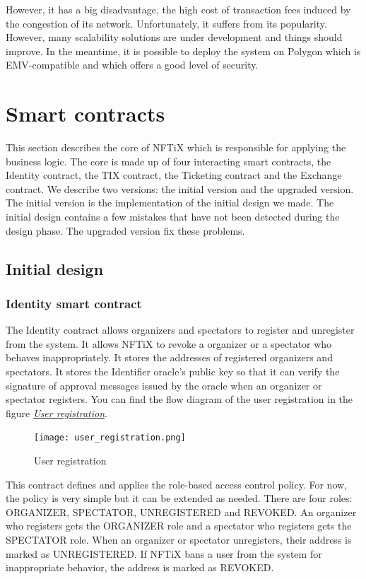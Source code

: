 \documentclass[a4paper,11pt,oneside]{report}
\begin{document}
However, it has a big disadvantage, the high cost of transaction fees induced by the congestion of its network. Unfortunately, it suffers from its popularity. However, many scalability solutions are under development and things should improve. In the meantime, it is possible to deploy the system on Polygon which is EMV-compatible and which offers a good level of security.

\section{Smart contracts}
This section describes the core of NFTiX which is responsible for applying the business logic. The core is made up of four interacting smart contracts, the Identity contract, the TIX contract, the Ticketing contract and the Exchange contract. We describe two versions: the initial version and the upgraded version. The initial version is the implementation of the initial design we made. The initial design contains a few mistakes that have not been detected during the design phase. The upgraded version fix these problems.

\subsection{Initial design}

\subsubsection{Identity smart contract}
The Identity contract allows organizers and spectators to register and unregister from the system. It allows NFTiX to revoke a organizer or a spectator who behaves inappropriately. It stores the addresses of registered organizers and spectators. It stores the Identifier oracle's public key so that it can verify the signature of approval messages issued by the oracle when an organizer or spectator registers. You can find the flow diagram of the user registration in the figure  \hyperref[fig:user_registration]{ \textit{User registration}}.

\begin{figure}[h!]
  \texttt{[image: user\_registration.png]}
  \caption{User registration}
  \label{fig:user_registration}
\end{figure}

This contract defines and applies the role-based access control policy. For now, the policy is very simple but it can be extended as needed. There are four roles: ORGANIZER, SPECTATOR, UNREGISTERED and REVOKED. An organizer who registers gets the ORGANIZER role and a spectator who registers gets the SPECTATOR role. When an organizer or spectator unregisters, their address is marked as UNREGISTERED. If NFTiX bans a user from the system for inappropriate behavior, the address is marked as REVOKED.
\end{document}

